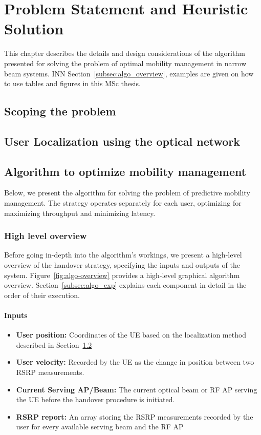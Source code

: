 \chapter{Problem Statement and Heuristic Solution}
\label{chp:problem_statement}

This chapter describes the details and design considerations of the algorithm presented for solving the problem of optimal mobility management in narrow beam systems. INN Section~\ref{subsec:algo_overview}, examples are given on how to use tables and figures in this MSc thesis.

\section{Scoping the problem}
\label{sec:scope}
\section{User Localization using the optical network}
\label{sec:loc_calc}
\section{Algorithm to optimize mobility management}
\label{sec:algorithm}
Below, we present the algorithm for solving the problem of predictive mobility management. The strategy operates separately for each user, optimizing for maximizing throughput and minimizing latency.
\subsection{High level overview}
Before going in-depth into the algorithm's workings, we present a high-level overview of the handover strategy, specifying the inputs and outputs of the system. Figure~\ref{fig:algo-overview} provides a high-level graphical algorithm overview. Section~\ref{subsec:algo_exp} explains each component in detail in the order of their execution.
\subsubsection{Inputs}
\begin{itemize}
    \item \textbf{User position:} Coordinates of the UE based on the localization method described in Section~\ref{sec:loc_calc}
    \item \textbf{User velocity:} Recorded by the UE as the change in position between two RSRP measurements.
    \item \textbf{Current Serving AP/Beam:} The current optical beam or RF AP serving the UE before the handover procedure is initiated.
    \item \textbf{RSRP report:} An array storing the RSRP measurements recorded by the user for every available serving beam and the RF AP
\end{itemize}

